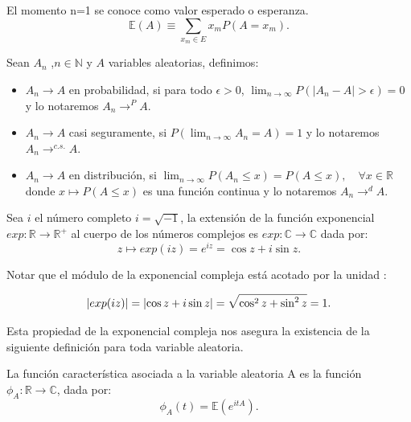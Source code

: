 \documentclass[../proyecto.tex]{memoir}
\begin{document}
El momento n=1 se conoce como valor esperado o esperanza. $$
\mathds{E}(A) \equiv \sum_{x_m \in E} x_m P(A=x_m).
$$

\begin{defi}
Sean ${A_n}$ ,$n\in \mathds{N}$ y $A$ variables aleatorias, definimos:
\begin{itemize}
\item $A_n \to A$ en probabilidad, si para todo $\epsilon > 0$, $\lim_{n\to\infty} P( |A_n-A|> \epsilon ) = 0$ y lo notaremos $A_n \to^{P} A$.
\item $A_n \to A$ casi seguramente, si $P(\lim_{n\to\infty} A_n=A) = 1$ y lo notaremos $A_n \to^{c.s.} A$.
\item $A_n \to A$ en distribución, si $\lim_{n \to \infty} P(A_n \leq x) = P(A \leq x),\quad \forall x \in \mathds{R}$ donde $x\mapsto P(A \leq x)$ es una función continua y lo notaremos $A_n \to^{d} A$.
\end{itemize}
\end{defi}

\begin{defi}
Sea $i$ el número completo $i=\sqrt{-1}$, la extensión de la función exponencial $exp: \mathds{R} \to \mathds{R^{+}}$ al cuerpo de los números complejos es $exp: \mathds{C} \to \mathds{C}$ dada por:
$$
z \mapsto exp(iz) = e^{iz}=\cos z+i\sin z.
$$
\end{defi}

Notar que el módulo de la exponencial compleja está acotado por la unidad :

$$
\abs{ exp(iz) } = \abs{\cos z+i\sin z} = \sqrt{\cos^2 z + \sin^2 z} = 1.
$$

Esta propiedad de la exponencial compleja nos asegura la existencia de la siguiente definición para toda variable aleatoria.

\begin{defi}
La función característica asociada a la variable aleatoria A es la función $\phi_{A}: \mathds{R} \to \mathds{C}$, dada por:
$$
\phi_{A}(t) = \mathds{E}(e^{itA}).
$$
\end{defi}
\end{document}
